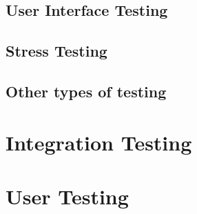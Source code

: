\subsection{User Interface Testing}

\subsection{Stress Testing}

\subsection{Other types of testing}

\section{Integration Testing}

\section{User Testing}